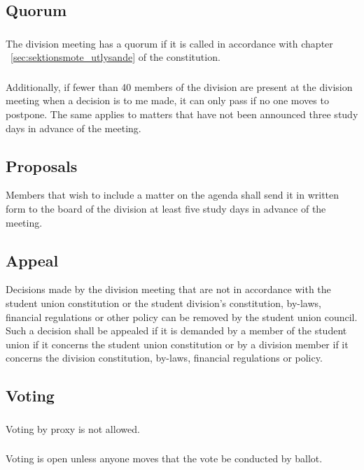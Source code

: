 \documentclass[a4paper]{dtek}
\begin{document}
\subsection{Quorum}
\subsubsection{}
The division meeting has a quorum if it is called in accordance with chapter ~\ref{sec:sektionsmote_utlysande} of the constitution. 

\subsubsection{}
Additionally, if fewer than 40 members of the division are present at the division meeting when a decision is to me made, it can only pass if no one moves to postpone. The same applies to matters that have not been announced three study days in advance of the meeting. 

\subsection{Proposals}
Members that wish to include a matter on the agenda shall send it in written form to the board of the division at least five study days in advance of the meeting. 

\subsection{Appeal}
Decisions made by the division meeting that are not in accordance with the student union constitution or the student division's constitution, by-laws, financial regulations or other policy can be removed by the student union council. Such a decision shall be appealed if it is demanded by a member of the student union if it concerns the student union constitution or by a division member if it concerns the division constitution, by-laws, financial regulations or policy. 


\subsection{Voting}

\subsubsection{}
Voting by proxy is not allowed. 

\subsubsection{}
Voting is open unless anyone moves that the vote be conducted by ballot.
\end{document}
